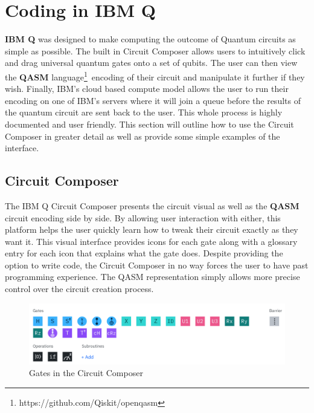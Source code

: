 \documentclass[12pt]{article}
\newcommand{\qasm}{\footnote{https://github.com/Qiskit/openqasm}}
\begin{document}
\section{Coding in IBM Q}
    \textbf{IBM Q} was designed to make computing the outcome of Quantum circuits as simple as possible. The built in Circuit Composer allows users to intuitively click and drag universal quantum gates onto a set of qubits. The user can then view the \textbf{QASM} language\qasm \ encoding of their circuit and manipulate it further if they wish. Finally, IBM's cloud based compute model allows the user to run their encoding on one of IBM's servers where it will join a queue before the results of the quantum circuit are sent back to the user. This whole process is highly documented and user friendly. 
    This section will outline how to use the Circuit Composer in greater detail as well as provide some simple examples of the interface.
    
    \subsection{Circuit Composer}
        The IBM Q Circuit Composer presents the circuit visual as well as the \textbf{QASM} circuit encoding side by side. By allowing user interaction with either, this platform helps the user quickly learn how to tweak their circuit exactly as they want it. This visual interface provides icons for each gate along with a glossary entry for each icon that explains what the gate does. Despite providing the option to write code, the Circuit Composer in no way forces the user to have past programming experience. The QASM representation simply allows more precise control over the circuit creation process.
        
        \begin{figure}[ht]
            \centering
            \includegraphics[width=\linewidth]{Circuits/gates.png}
            \caption{Gates in the Circuit Composer}
        \end{figure}
        
\end{document}
